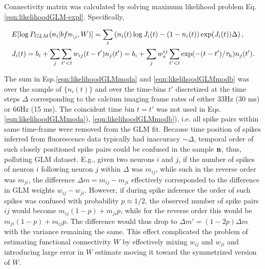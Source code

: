 Connectivity matrix was calculated by solving maximum likelihood problem Eq. \eqref{eqn:likelihoodGLM-expl}. Specifically, 

\begin{align}
\label{eqn:likelihoodGLMmoda}&E[\log P_{GLM}(n_i|{bf n}_{\backslash i}, W)]=\sum_t \left( n_i(t) \log J_i(t) - (1-n_i(t)) \exp(J_i(t)) \Delta \right), \\
\label{eqn:likelihoodGLMmodb}&J_i(t)=b_i+\sum\limits_j \sum\limits_{t'<t} w_{ij}(t-t')n_{j}(t')=
b_i+\sum\limits_j w^{ij}_s \sum\limits_{t'<t} \exp(-(t-t')/\tau_h)n_j(t').
\end{align}

The sum in Eqs.\eqref{eqn:likelihoodGLMmoda} and \eqref{eqn:likelihoodGLMmodb} was over the sample of $\{n_i(t)\}$ and over the time-bins $t'$ discretized at the time steps $\Delta$ corresponding to the calcium imaging frame rates of either 33Hz (30 ms) or 66Hz (15 ms). The coincident time bin $t=t'$ was not used in Eqs.\eqref{eqn:likelihoodGLMmoda}), \eqref{eqn:likelihoodGLMmodb}), i.e.  all spike pairs within same time-frame were removed from the GLM fit.  Because time position of spikes inferred from fluorescence data typically had inaccuracy $\sim \Delta$, temporal order of such closely positioned spike pairs could be confused in the sample ${\bf n}$, thus, polluting GLM dataset.  E.g., given two neurons $i$ and $j$, if the number of spikes of neuron $i$ following neuron $j$ within $\Delta$ was $m_{ij}$, while such in the reverse order was $m_{ji}$, the difference $\Delta m = m_{ij}-m_{ji}$ effectively corresponded to the difference in GLM weights $w_{ij}-w_{ji}$. However, if during spike inference the order of such spikes was confused with probability $p\approx 1/2$, the observed number of spike pairs $ij$ would become $m_{ij}(1-p)+m_{ji}p$, while for the reverse order this would be $m_{ji}(1-p)+m_{ij}p$. The difference would thus drop to $\Delta m '= (1-2p)\Delta m$ with the variance remaining the same. This effect complicated the problem of estimating functional connectivity $W$ by effectively mixing $w_{ij}$ and $w_{ji}$ and introducing large error in $W$ estimate moving it toward the symmetrized version of $W$.

